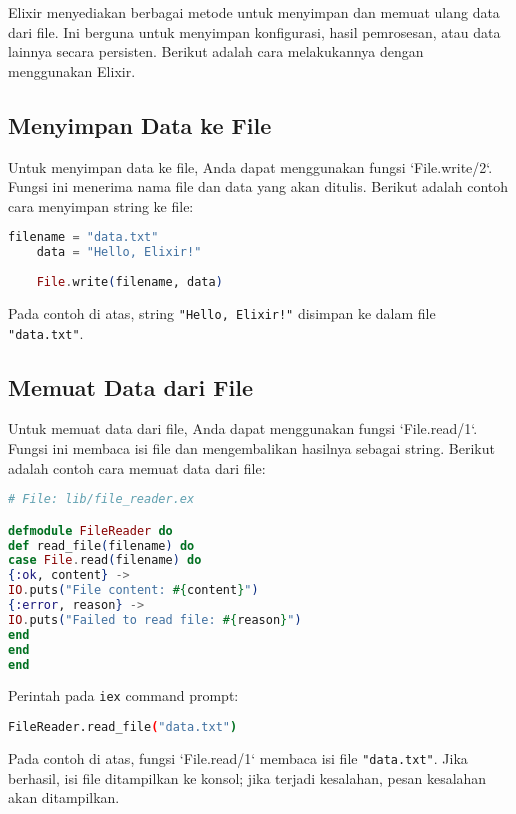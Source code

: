 Elixir menyediakan berbagai metode untuk menyimpan dan memuat ulang data dari file. Ini berguna untuk menyimpan konfigurasi, hasil pemrosesan, atau data lainnya secara persisten. Berikut adalah cara melakukannya dengan menggunakan Elixir.

\subsection{Menyimpan Data ke File}

Untuk menyimpan data ke file, Anda dapat menggunakan fungsi `File.write/2`. Fungsi ini menerima nama file dan data yang akan ditulis. Berikut adalah contoh cara menyimpan string ke file:

\begin{lstlisting}[language=Elixir]
	filename = "data.txt"
	data = "Hello, Elixir!"
	
	File.write(filename, data)
\end{lstlisting}

Pada contoh di atas, string \texttt{"Hello, Elixir!"} disimpan ke dalam file \texttt{"data.txt"}.

\subsection{Memuat Data dari File}

Untuk memuat data dari file, Anda dapat menggunakan fungsi `File.read/1`. Fungsi ini membaca isi file dan mengembalikan hasilnya sebagai string. Berikut adalah contoh cara memuat data dari file:

\begin{lstlisting}[language=Elixir]
# File: lib/file_reader.ex

defmodule FileReader do
def read_file(filename) do
case File.read(filename) do
{:ok, content} ->
IO.puts("File content: #{content}")
{:error, reason} ->
IO.puts("Failed to read file: #{reason}")
end
end
end
\end{lstlisting}

Perintah pada \texttt{iex} command prompt: 

\begin{lstlisting}[language=bash]
	FileReader.read_file("data.txt")
\end{lstlisting}

Pada contoh di atas, fungsi `File.read/1` membaca isi file \texttt{"data.txt"}. Jika berhasil, isi file ditampilkan ke konsol; jika terjadi kesalahan, pesan kesalahan akan ditampilkan.

